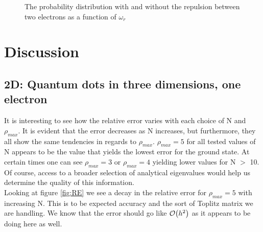 \documentclass[%
reprint,
amsmath,amssymb,
aps,
]{revtex4-1}
\begin{document}
\begin{figure}
	\caption{The probability distribution with and without the repulsion between two electrons as a function of $\omega_r$} \label{wavefunc}
\end{figure}

\section*{Discussion} 

\subsection*{2D: Quantum dots in three dimensions, one electron} \noindent 
It is interesting to see how the relative error varies with each choice of N and $\rho_{max}$. It is evident that the error decreases as N increases, but furthermore, they all show the same tendencies in regards to $\rho_{max}$. $\rho_{max} = 5$ for all tested values of N appears to be the value that yields the lowest error for the ground state. At certain times one can see $\rho_{max} = 3$ or $\rho_{max} = 4$ yielding lower values for N $>$ 10. Of course, access to a broader selection of analytical eigenvalues would help us determine the quality of this information. \\
Looking at figure \ref{fig:RE} we see a decay in the relative error for $\rho_{max} = 5$ with increasing N. This is to be expected accuracy and the sort of Toplitz matrix we are handling. We know that the error should go like $\order{h^2}$ as it appears to be doing here as well. 
\end{document}
